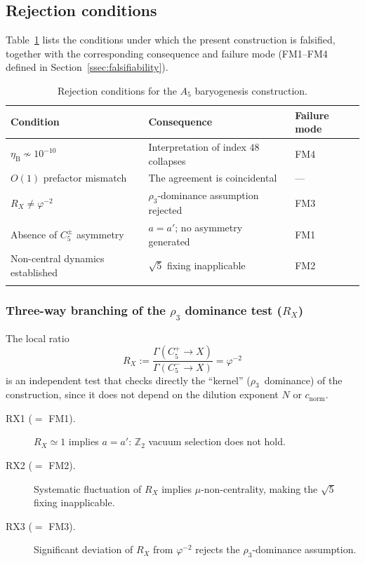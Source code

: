 \documentclass[sn-mathphys-num,Numbered]{sn-jnl}
\theoremstyle{thmstyleone}
\theoremstyle{thmstylethree}
\theoremstyle{thmstyletwo}
\newcommand{\etaB}{\eta_{\mathrm{B}}}
\begin{document}
\subsection{Rejection conditions}
\label{ssec:rejection}

Table~\ref{tab:rejection} lists the conditions under which the present
construction is falsified, together with the corresponding consequence
and failure mode (FM1--FM4 defined in
Section~\ref{ssec:falsifiability}).

\begin{table}[h]
\caption{Rejection conditions for the $A_5$ baryogenesis construction.}
\label{tab:rejection}
\begin{tabular}{@{}p{3.8cm}p{4.0cm}p{2.2cm}@{}}
\toprule
Condition & Consequence & Failure mode \\
\midrule
$\etaB \not\sim 10^{-10}$ &
  Interpretation of index $48$ collapses & FM4 \\
$O(1)$ prefactor mismatch &
  The agreement is coincidental & --- \\
$R_X \neq \varphi^{-2}$ &
  $\rho_3$-dominance assumption rejected & FM3 \\
Absence of $C_5^\pm$ asymmetry &
  $a = a'$; no asymmetry generated & FM1 \\
Non-central dynamics established &
  $\sqrt{5}$ fixing inapplicable & FM2 \\
\botrule
\end{tabular}
\end{table}

\subsubsection{Three-way branching of the \texorpdfstring{$\rho_3$}{rho3}
  dominance test (\texorpdfstring{$R_X$}{RX})}
\label{sssec:rx-branching}

The local ratio
\[
  R_X := \frac{\Gamma(C_5^+ \to X)}{\Gamma(C_5^- \to X)} = \varphi^{-2}
\]
is an independent test that checks directly the ``kernel''
($\rho_3$~dominance) of the construction, since it does not depend on
the dilution exponent $N$ or $c_{\mathrm{norm}}$.

\begin{description}
  \item[RX1 ($=$ FM1).]
    $R_X \simeq 1$ implies $a = a'$: $\mathbb{Z}_2$ vacuum selection
    does not hold.
  \item[RX2 ($=$ FM2).]
    Systematic fluctuation of $R_X$ implies $\mu$-non-centrality,
    making the $\sqrt{5}$ fixing inapplicable.
  \item[RX3 ($=$ FM3).]
    Significant deviation of $R_X$ from $\varphi^{-2}$ rejects the
    $\rho_3$-dominance assumption.
\end{description}
\end{document}
